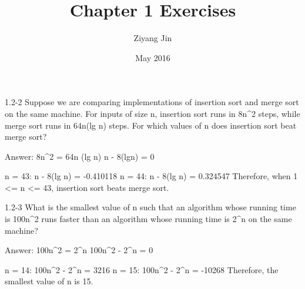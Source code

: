 \documentclass{article}
\title{Chapter 1 Exercises}
\author{Ziyang Jin}
\date{May 2016}
\begin{document}
1.2-2
Suppose we are comparing implementations of insertion sort and merge sort on the same machine. For inputs of size n, insertion sort runs in 8n^2 steps, while merge sort runs in 64n(lg n) steps. For which values of n does insertion sort beat merge sort?

Answer:
  8n^2 = 64n (lg n)
  n - 8(lgn) = 0
  
  n = 43:  n - 8(lg n) = -0.410118
  n = 44:  n - 8(lg n) =  0.324547
  Therefore, when 1 <= n <= 43, insertion sort beats merge sort.

1.2-3
What is the smallest value of n such that an algorithm whose running time is 100n^2 runs faster than an algorithm whose running time is 2^n on the same machine?

Answer:
  100n^2 = 2^n
  100n^2 - 2^n = 0
  
  n = 14: 100n^2 - 2^n = 3216
  n = 15: 100n^2 - 2^n = -10268
  Therefore, the smallest value of n is 15.
\end{document}
